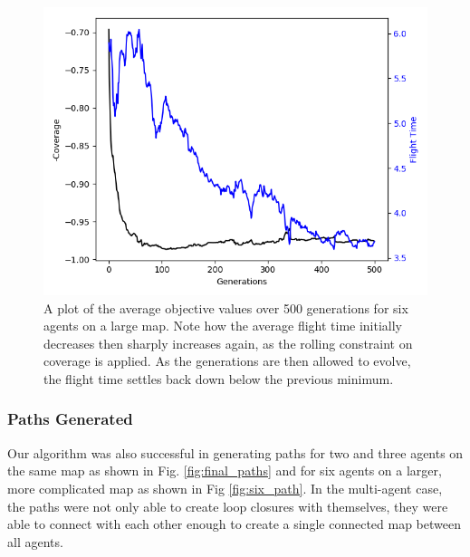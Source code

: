 \documentclass[letterpaper, 10 pt, conference]{ieeeconf}  %
\begin{document}
\begin{figure}
  \centering
  \includegraphics[width=1.0\linewidth]{figures/multi_agent_pareto_hist.png}
  \caption{A plot of the average objective values over 500 generations for six agents on a large map. Note how the average flight time initially decreases then sharply increases again, as the rolling constraint on coverage is applied. As the generations are then allowed to evolve, the flight time settles back down below the previous minimum.}
  \label{fig:multi_fitness}
\end{figure}

\subsubsection{Paths Generated}
Our algorithm was also successful in generating paths for two and three agents on the same map as shown in Fig. \ref{fig:final_paths} and for six agents on a larger, more complicated map as shown in Fig \ref{fig:six_path}. In the multi-agent case, the paths were not only able to create loop closures with themselves, they were able to connect with each other enough to create a single connected map between all agents.
\end{document}
